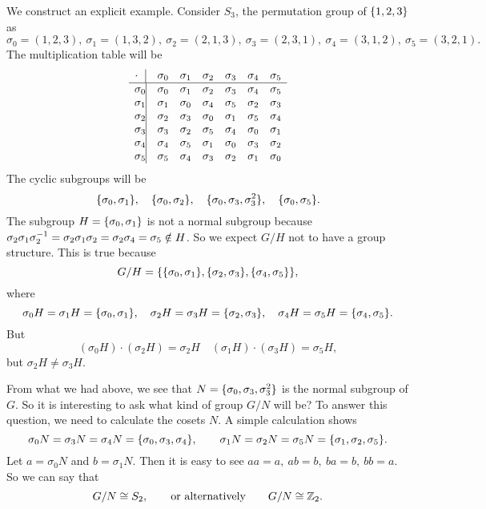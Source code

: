 \begin{observation}
	We construct an explicit example. Consider $ S_3 $, the permutation group of $ \{1,2,3\} $ as
	\[ \sigma_0 = (1,2,3),\ \sigma_1 = (1,3,2),\ \sigma_2=(2,1,3),\ \sigma_3 =(2,3,1),\ \sigma_4 = (3,1,2),\ \sigma_5 = (3,2,1). \]
	The multiplication table will be
	\[ 
	\begin{matrix}
		\cdot\ \ \vline & \sigma_0 & \sigma_1 & \sigma_2 & \sigma_3 & \sigma_4 & \sigma_5 \\
		\hline
		\sigma_0 \vline & \sigma_0 & \sigma_1 & \sigma_2 & \sigma_3 & \sigma_4 & \sigma_5 \\
		\sigma_1 \vline & \sigma_1 & \sigma_0 & \sigma_4 & \sigma_5 & \sigma_2 & \sigma_3 \\
		\sigma_2 \vline & \sigma_2 & \sigma_3 & \sigma_0 & \sigma_1 & \sigma_5 & \sigma_4 \\
		\sigma_3 \vline & \sigma_3 & \sigma_2 & \sigma_5 & \sigma_4 & \sigma_0 & \sigma_1 \\
		\sigma_4 \vline & \sigma_4 & \sigma_5 & \sigma_1 & \sigma_0 & \sigma_3 & \sigma_2 \\
		\sigma_5 \vline & \sigma_5 & \sigma_4 & \sigma_3 & \sigma_2 & \sigma_1 & \sigma_0 
	\end{matrix}
	 \]
	 The cyclic subgroups will be
	 \[ \{\sigma_0,\sigma_1\},\quad \{\sigma_0,\sigma_2\},\quad \{\sigma_0,\sigma_3,\sigma_3^2\},\quad \{\sigma_0,\sigma_5\}. \]
	 The subgroup $ H = \{\sigma_0, \sigma_1\} $ is not a normal subgroup because $ \sigma_2 \sigma_1 \sigma_2^{-1} = \sigma_2 \sigma_1 \sigma_2 = \sigma_2 \sigma_4 = \sigma_5 \notin H $. So we expect $ G/H $ not to have a group structure. This is true because
	 \[ G/H = \{\{\sigma_0,\sigma_1\}, \{\sigma_2,\sigma_3\},\{\sigma_4,\sigma_5\}\}, \]
	 where
	 \[ \sigma_0 H  = \sigma_1 H = \{\sigma_0,\sigma_1\},\quad \sigma_2H = \sigma_3 H = \{\sigma_2,\sigma_3\},\quad \sigma_4H=\sigma_5H = \{\sigma_4,\sigma_5\}.\]
	 But
	 \[ (\sigma_0 H)\cdot (\sigma_2 H) = \sigma_2 H \quad (\sigma_1H)\cdot(\sigma_3 H) = \sigma_5 H, \]
	 but
	 $ \sigma_2 H \neq \sigma_3 H $.
	 
	 
	 \begin{example}[Quotient of $ S_3 $]
	 	From what we had above, we see that $ N = \{\sigma_0, \sigma_3,\sigma_3^2\} $ is the normal subgroup of $ G $. So it is interesting to ask what kind of group $ G/N $ will be? To answer this question, we need to calculate the cosets $ N $. A simple calculation shows
	 	\[ \sigma_0N = \sigma_3N = \sigma_4N = \{\sigma_0,\sigma_3,\sigma_4\}, \qquad  \sigma_1N =\sigma_2N = \sigma_5 N = \{\sigma_1,\sigma_2,\sigma_5\}.  \]
	 	Let $ a = \sigma_0 N $ and $ b = \sigma_1N $. Then it is easy to see $ aa = a,\ ab = b,\ ba = b,\ bb = a $. So we can say that 
	 	\[ G/N \cong S_2, \qquad \text{or alternatively} \qquad G/N \cong \mathbb{Z}_2. \]
	 \end{example}
	 

\end{observation}
